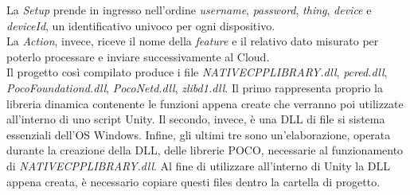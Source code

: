 La \textit{Setup} prende in ingresso nell'ordine \textit{username}, \textit{password}, \textit{thing}, \textit{device}  e \textit{deviceId}, un identificativo univoco per ogni dispositivo.\\
La \textit{Action}, invece, riceve il nome della \textit{feature} e il relativo dato misurato per poterlo processare e inviare successivamente al Cloud.\\
Il progetto così compilato produce i file \textit{NATIVECPPLIBRARY.dll}, \textit{pcred.dll}, \textit{PocoFoundationd.dll}, \textit{PocoNetd.dll}, \textit{zlibd1.dll}. Il primo rappresenta proprio la libreria dinamica contenente le funzioni appena create che verranno poi utilizzate all'interno di uno script Unity. Il secondo, invece, è una DLL di file si sistema essenziali dell'OS Windows. Infine, gli ultimi tre sono un’elaborazione, operata durante la creazione della DLL, delle librerie POCO, necessarie al funzionamento di  \textit{NATIVECPPLIBRARY.dll}. Al fine di utilizzare all'interno di Unity la DLL appena creata, è necessario copiare questi files dentro la cartella di progetto.
